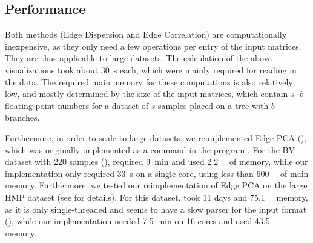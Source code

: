 \subsection{Performance}
\label{ch:Visualization:sec:Results:sub:Performance}

Both methods (Edge Dispersion and Edge Correlation) are computationally inexpensive,
as they only need a few operations per entry of the input matrices.
They are thus applicable to large datasets.
The calculation of the above visualizations took about \SI{30}{\second} each,
which were mainly required for reading in the data.
The required main memory for these computations is also relatively low,
and mostly determined by the size of the input matrices,
which contain $s \cdot b$ floating point numbers for a dataset of $s$ samples placed on a tree with $b$ branches.

Furthermore, in order to scale to large datasets, we reimplemented Edge PCA
(),
which was originally implemented as a command in the  program \cite{Matsen2010}.
For the \ac{BV} dataset with \num{220} samples (),
 required \SI{9}{\minute} and used \SI{2.2}{\giga\byte} of memory,
while our implementation only required \SI{33}{\second} on a single core, using less than \SI{600}{\mega\byte} of main memory.
Furthermore, we tested our reimplementation of Edge PCA on the large \acf{HMP} dataset
(see  for details).
For this dataset,  took \num{11} days and \SI{75.1}{\giga\byte} memory,
as it is only single-threaded and seems to have a slow parser for the  input format
(),
while our implementation needed \SI{7.5}{\minute} on \num{16} cores and used \SI{43.5}{\giga\byte} memory.



%


